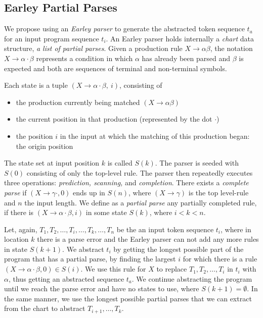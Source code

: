 \subsection{Earley Partial Parses}
\label{sec:prog-abstract:partial}

We propose using an \emph{Earley parser} to generate the abstracted token
sequence $t_a$ for an input program sequence $t_i$. An Earley parser holds
internally a \emph{chart} data structure, \ie \emph{a list of partial parses}.
Given a production rule $X \rightarrow \alpha \beta$, the notation $X
\rightarrow \alpha \cdot \beta$ represents a condition in which $\alpha$ has
already been parsed and $\beta$ is expected and both are sequences of terminal
and non-terminal symbols.

Each state is a tuple $(X \rightarrow \alpha \cdot \beta,\ i)$, consisting of
\begin{itemize}
    \item the production currently being matched $(X \rightarrow \alpha \beta)$
    \item the current position in that production (represented by the dot
    $\cdot$)
    \item the position $i$ in the input at which the matching of this production
    began: the origin position
\end{itemize}

The state set at input position $k$ is called $S(k)$. The parser is seeded with
$S(0)$ consisting of only the top-level rule. The parser then repeatedly
executes three operations: \emph{prediction, scanning,} and \emph{completion}.
There exists a \emph{complete parse} if $(X \rightarrow \gamma \cdot, 0)$ ends
up in $S(n)$, where $(X \rightarrow \gamma)$ is the top level-rule and $n$ the
input length. We define as a \emph{partial parse} any partially completed rule,
\ie if there is $(X \rightarrow \alpha \cdot \beta, i)$ in some state $S(k)$,
where $i < k < n$.

Let, again, $T_1, T_2, \dots, T_i, \dots, T_k, \dots, T_n$ be the an input token
sequence $t_i$, where in location $k$ there is a parse error and the Earley
parser can not add any more rules in state $S(k + 1)$. We abstract $t_i$ by
getting the longest possible part of the program that has a partial parse, \ie
by finding the largest $i$ for which there is a rule $(X \rightarrow \alpha
\cdot \beta, 0) \in S(i)$. We use this rule for $X$ to replace $T_1, T_2, \dots,
T_i$ in $t_i$ with $\alpha$, thus getting an abstracted sequence $t_a$. We
continue abstracting the program until we reach the parse error and have no
states to use, \ie where $S(k + 1) = \emptyset$. In the same manner, we use the
longest possible partial parses that we can extract from the chart to abstract
$T_{i+1}, \dots, T_k$.

